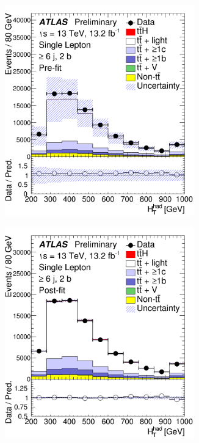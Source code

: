 \begin{figure}[htbp!]
\begin{subfigure}{0.24\textwidth}
  \caption{}
  \label{}
\end{subfigure}
\begin{subfigure}{0.24\textwidth}
  \centering
  \includegraphics[width=0.9\textwidth]{figures/ttH/fig_08e.png}
  \caption{}
  \label{}
\end{subfigure}
\begin{subfigure}{0.24\textwidth}
  \centering
  \includegraphics[width=0.9\textwidth]{figures/ttH/fig_08f.png}
  \caption{}
  \label{}
\end{subfigure}


\end{figure}

